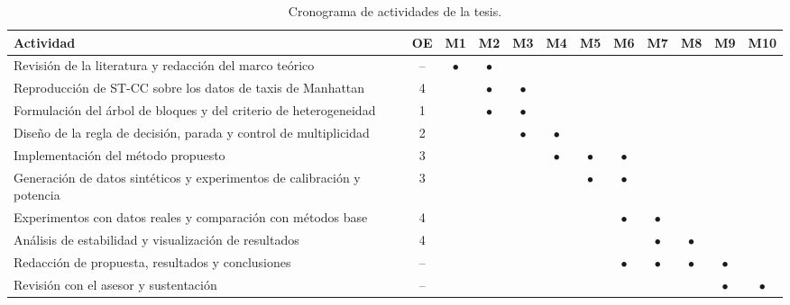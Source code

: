 \begin{table}[htbp]
\centering
\small
\setlength{\tabcolsep}{3pt}  %
\begin{tabular}{>{\raggedright\arraybackslash}p{5.4cm} c *{10}{c}}
\hline
\textbf{Actividad} & \textbf{OE} &
\textbf{M1} & \textbf{M2} & \textbf{M3} & \textbf{M4} & \textbf{M5} &
\textbf{M6} & \textbf{M7} & \textbf{M8} & \textbf{M9} & \textbf{M10} \\
\hline
Revisión de la literatura y redacción del marco teórico
    & -- & $\bullet$ & $\bullet$ & & & & & & & & \\
Reproducción de \ac{ST-CC} sobre los datos de taxis de Manhattan
    & 4 & & $\bullet$ & $\bullet$ & & & & & & & \\
Formulación del árbol de bloques y del criterio de heterogeneidad
    & 1 & & $\bullet$ & $\bullet$ & & & & & & & \\
Diseño de la regla de decisión, parada y control de multiplicidad
    & 2 & & & $\bullet$ & $\bullet$ & & & & & & \\
Implementación del método propuesto
    & 3 & & & & $\bullet$ & $\bullet$ & $\bullet$ & & & & \\
Generación de datos sintéticos y experimentos de calibración y potencia
    & 3 & & & & & $\bullet$ & $\bullet$ & & & & \\
Experimentos con datos reales y comparación con métodos base
    & 4 & & & & & & $\bullet$ & $\bullet$ & & & \\
Análisis de estabilidad y visualización de resultados
    & 4 & & & & & & & $\bullet$ & $\bullet$ & & \\
Redacción de propuesta, resultados y conclusiones
    & -- & & & & & & $\bullet$ & $\bullet$ & $\bullet$ & $\bullet$ & \\
Revisión con el asesor y sustentación
    & -- & & & & & & & & & $\bullet$ & $\bullet$ \\
\hline
\end{tabular}
\caption{Cronograma de actividades de la tesis.}
\label{tab:cronograma}
\end{table}